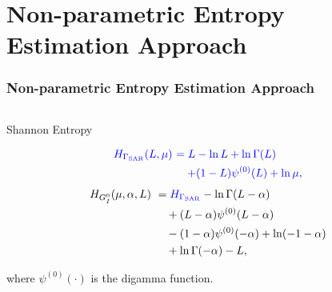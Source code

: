 \documentclass[aspectratio=1610,10pt]{beamer}
\begin{document}
\section{Non-parametric Entropy Estimation Approach}
\begin{frame} \frametitle{\large{Non-parametric Entropy Estimation Approach}}\vspace{0.4cm}	

 \justifying
\begin{columns}[T,onlytextwidth]
    \begin{column}{.45\textwidth}
			\begin{block}{Shannon Entropy}\justifying
 
\begin{small}
\begin{align*}
 \textcolor[rgb]{0,0,1}{H_{\Gamma_{\text{SAR}}}(L, \mu)} \ &\textcolor[rgb]{0,0,1}{  =  L -\ln L+\ln\Gamma(L)}\\
& \textcolor[rgb]{0,0,1}{\quad +(1-L)\psi^{(0)}(L) + \ln \mu, }
\end{align*} 
\begin{align*}
H_{G_I^0}(\mu, \alpha, L) \ &=\textcolor[rgb]{0,0,1}{ H_{\Gamma_{\text{SAR}}}} -\ln\Gamma(L-\alpha)\\
&\quad + (L-\alpha) \psi^{(0)}(L-\alpha)\\
&\quad -(1-\alpha)\psi^{(0)}(-\alpha)+\ln (-1-\alpha)\\
&\quad+\ln\Gamma(-\alpha)-L,
\end{align*}
\end{small}
where \(\psi^{(0)}(\cdot)\) is the digamma function.
		\end{block}
    \end{column}
		

\end{columns}
\end{frame}
\end{document}
